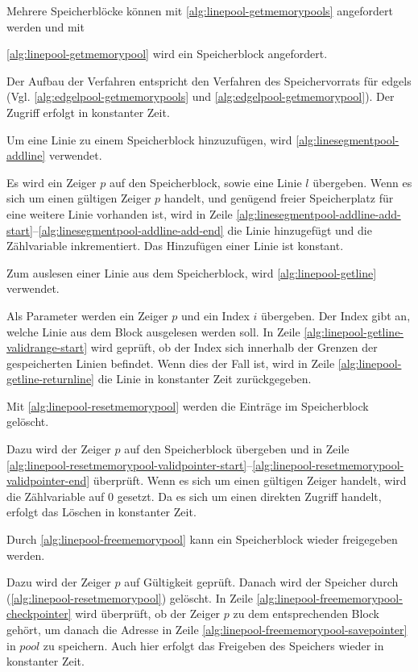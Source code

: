 Mehrere Speicherblöcke können mit \autoref{alg:linepool-getmemorypools} angefordert werden und mit

 \autoref{alg:linepool-getmemorypool} wird ein Speicherblock angefordert.

Der Aufbau der Verfahren entspricht den Verfahren des Speichervorrats für \glspl{edgel}
 (Vgl. \autoref{alg:edgelpool-getmemorypools} und \autoref{alg:edgelpool-getmemorypool}). Der Zugriff erfolgt in
 konstanter Zeit.

Um eine Linie zu einem Speicherblock hinzuzufügen, wird \autoref{alg:linesegmentpool-addline} verwendet.

Es wird ein Zeiger $p$ auf den Speicherblock, sowie eine Linie $l$ übergeben. Wenn es sich um einen gültigen Zeiger $p$
 handelt, und genügend freier Speicherplatz für eine weitere Linie vorhanden ist, wird in Zeile
 \ref{alg:linesegmentpool-addline-add-start}--\ref{alg:linesegmentpool-addline-add-end} die Linie hinzugefügt und die
 Zählvariable inkrementiert. Das Hinzufügen einer Linie ist konstant.

Zum auslesen einer Linie aus dem Speicherblock, wird \autoref{alg:linepool-getline} verwendet.

Als Parameter werden ein Zeiger $p$ und ein Index $i$ übergeben. Der Index gibt an, welche Linie aus dem Block
 ausgelesen werden soll. In Zeile \ref{alg:linepool-getline-validrange-start} wird geprüft, ob der Index sich innerhalb
 der Grenzen der gespeicherten Linien befindet. Wenn dies der Fall ist, wird in Zeile
 \ref{alg:linepool-getline-returnline} die Linie in konstanter Zeit zurückgegeben.

Mit \autoref{alg:linepool-resetmemorypool} werden die Einträge im Speicherblock gelöscht.

Dazu wird der Zeiger $p$ auf den Speicherblock übergeben und in Zeile
 \ref{alg:linepool-resetmemorypool-validpointer-start}--\ref{alg:linepool-resetmemorypool-validpointer-end} überprüft.
 Wenn es sich um einen gültigen Zeiger handelt, wird die Zählvariable auf $0$ gesetzt. Da es sich um einen direkten
 Zugriff handelt, erfolgt das Löschen in konstanter Zeit.

Durch \autoref{alg:linepool-freememorypool} kann ein Speicherblock wieder freigegeben werden.

Dazu wird der Zeiger $p$ auf Gültigkeit geprüft. Danach wird der Speicher durch 
 (\autoref{alg:linepool-resetmemorypool}) gelöscht. In Zeile \ref{alg:linepool-freememorypool-checkpointer} wird
 überprüft, ob der Zeiger $p$ zu dem entsprechenden Block gehört, um danach die Adresse in Zeile
 \ref{alg:linepool-freememorypool-savepointer} in $\mathit{pool}$ zu speichern. Auch hier erfolgt das Freigeben des
 Speichers wieder in konstanter Zeit.

